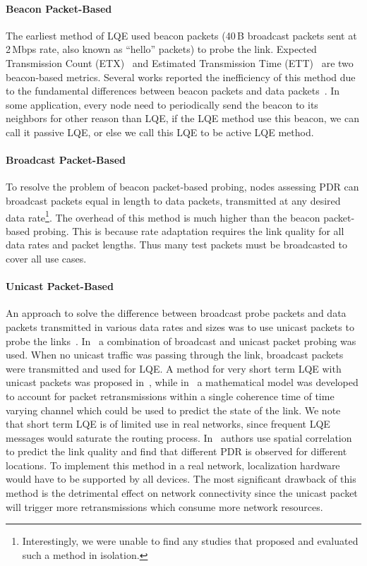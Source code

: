 \documentclass[11pt,draftclsnofoot,journal,onecolumn]{IEEEtran}
\begin{document}
\paragraph{Beacon Packet-Based}

The earliest method of LQE used beacon packets (40\,B broadcast packets sent at 2\,Mbps rate, also known as ``hello'' packets) to probe the link. Expected Transmission Count (ETX)~\cite{Couto_WN_2005} and Estimated Transmission Time (ETT)~\cite{BicketMobicom2005} are two beacon-based metrics. Several works reported the inefficiency of this method due to the fundamental differences between beacon packets and data packets~\cite{zhou_2009_CCNC,Kim2006,Kim_Ton_2009}. In some application, every node need to periodically send the beacon to its neighbors for other reason than LQE, if the LQE method use this beacon, we can call it passive LQE, or else we call this LQE to be active LQE method.

\paragraph{Broadcast Packet-Based}

To resolve the problem of beacon packet-based probing, nodes assessing PDR can broadcast packets equal in length to data packets, transmitted at any desired data rate\footnote{Interestingly, we were unable to find any studies that proposed and evaluated such a method in isolation.}. The overhead of this method is much higher than the beacon packet-based probing. This is because rate adaptation requires the link quality for all data rates and packet lengths. Thus many test packets must be broadcasted to cover all use cases.

\paragraph{Unicast Packet-Based}

An approach to solve the difference between broadcast probe packets and data packets transmitted in various data rates and sizes was to use unicast packets to probe the links~\cite{Kim2006}. In~\cite{fonseca_2007_hotnets} a combination of broadcast and unicast packet probing was used. When no unicast traffic was passing through the link, broadcast packets were transmitted and used for LQE. A method for very short term LQE with unicast packets was proposed in~\cite{alizai_2008_FGSN}, while in~\cite{keshavarzian_2007_communciation_letter} a mathematical model was developed to account for packet retransmissions within a single coherence time of time varying channel which could be used to predict the state of the link. We note that short term LQE is of limited use in real networks, since frequent LQE messages would saturate the routing process. In~\cite{xu_2006_Percom} authors use spatial correlation to predict the link quality and find that different PDR is observed for different locations. To implement this method in a real network, localization hardware would have to be supported by all devices. The most significant drawback of this method is the detrimental effect on network connectivity since the unicast packet will trigger more retransmissions which consume more network resources. 
\end{document}
